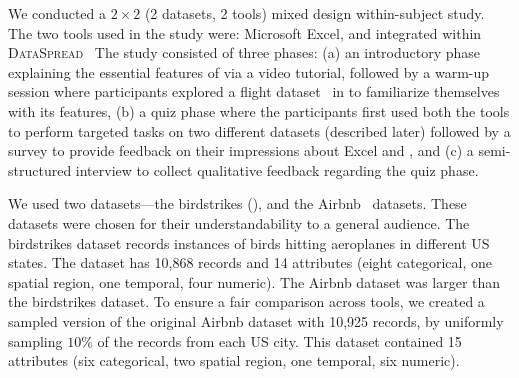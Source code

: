  We conducted a $2 \times 2$ (2 datasets, 2 tools) mixed design within-subject study. The two tools used in the study were: Microsoft Excel, and \noah integrated within {\scshape DataSpread}~\cite{dataspread} 
The study consisted of three phases: (a) an introductory phase explaining
the essential features of \noah via a video tutorial, followed by a warm-up session where participants explored a flight dataset~\cite{web:flight} in \noah 
to familiarize themselves with its features,
(b) a quiz phase where the participants first used both the tools
to perform targeted tasks on two different datasets (described later) 
followed by a survey to provide feedback on their impressions about Excel and \noah, and
(c) a semi-structured interview to collect qualitative feedback regarding the quiz phase. 

 We used two datasets---the birdstrikes (), and the Airbnb~\cite{web:airbnb} datasets. These datasets were chosen for their understandability to a general audience. The birdstrikes dataset records instances of birds hitting aeroplanes in different US states. The dataset has 10,868 records and 14 attributes (eight categorical, one spatial region, one temporal, four numeric). 
The Airbnb dataset was larger than the birdstrikes dataset. To ensure a fair comparison across tools, we created a sampled version of the original Airbnb dataset with 10,925 records, by uniformly sampling $10\%$ of the records from each US city. This dataset contained 15 attributes (six categorical, two spatial region, one temporal, six numeric).


